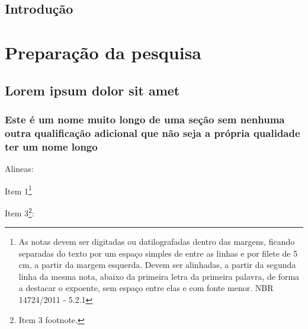 \documentclass[12pt,openright,twoside,a4paper]{abntex2}
\begin{document}
\chapter*{Introdução}


\lipsum[1-2]

\part{Preparação da pesquisa}

\chapter{Lorem ipsum dolor sit amet}

\section{Este é um nome muito longo de uma seção sem nenhuma outra qualificação
adicional que não seja a própria qualidade ter um nome longo}

\lipsum[3]

Alineas:

\begin{alineas}
  \item Item 1\footnote{As notas devem ser digitadas ou datilografadas
  dentro das margens, ficando separadas do texto por um espaço simples de entre as
  linhas e por filete de 5 cm, a partir da margem esquerda. Devem ser
  alinhadas, a partir da segunda linha da mesma nota, abaixo da primeira letra
  da primeira palavra, de forma a destacar o expoente, sem espaço entre elas e
  com fonte menor. NBR 14724/2011 - 5.2.1}
  \item \lipsum[41]
  \item Item 3\footnote{Item 3 footnote.}:
  \begin{alineas}
    \item \lipsum[50]
    \item \lipsum[51]
  \end{alineas}
  \begin{incisos}
    \item \lipsum[52]
    \item \lipsum[53]
  \end{incisos}
  \item \lipsum[60]
\end{alineas}
\end{document}
